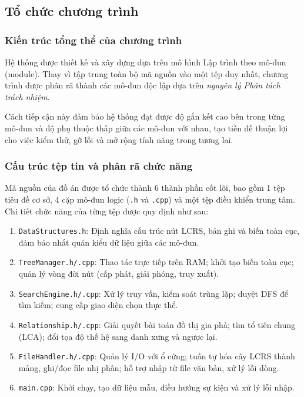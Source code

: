 \subsection{Tổ chức chương trình}
\subsubsection{Kiến trúc tổng thể của chương trình}
Hệ thống được thiết kế và xây dựng dựa trên mô hình Lập trình theo mô-đun (module). Thay vì tập trung toàn bộ mã nguồn vào một tệp duy nhất, chương trình được phân rã thành các mô-đun độc lập dựa trên \textit{nguyên lý Phân tách trách nhiệm}.

Cách tiếp cận này đảm bảo hệ thống đạt được độ gắn kết cao bên trong từng mô-đun và độ phụ thuộc thấp giữa các mô-đun với nhau, tạo tiền đề thuận lợi cho việc kiểm thử, gỡ lỗi và mở rộng tính năng trong tương lai.
\subsubsection{Cấu trúc tệp tin và phân rã chức năng}

Mã nguồn của đồ án được tổ chức thành 6 thành phần cốt lõi, bao gồm 1 tệp tiêu đề cơ sở, 4 cặp mô-đun logic (\texttt{.h} và \texttt{.cpp}) và một tệp điều khiển trung tâm. Chi tiết chức năng của từng tệp được quy định như sau:
\begin{enumerate}[label*=(\alph*)]
	\item \texttt{DataStructures.h}: Định nghĩa cấu trúc nút LCRS, bản ghi và biến toàn cục, đảm bảo nhất quán kiểu dữ liệu giữa các mô-đun.
	\item \texttt{TreeManager.h/.cpp}: Thao tác trực tiếp trên RAM; khởi tạo biến toàn cục; quản lý vòng đời nút (cấp phát, giải phóng, truy xuất).
	\item \texttt{SearchEngine.h/.cpp}: Xử lý truy vấn, kiểm soát trùng lặp; duyệt DFS để tìm kiếm; cung cấp giao diện chọn thực thể.
	\item \texttt{Relationship.h/.cpp}: Giải quyết bài toán đồ thị gia phả; tìm tổ tiên chung (LCA); đổi tọa độ thế hệ sang danh xưng và ngược lại.
	\item \texttt{FileHandler.h/.cpp}: Quản lý I/O với ổ cứng; tuần tự hóa cây LCRS thành mảng, ghi/đọc file nhị phân; hỗ trợ nhập từ file văn bản, xử lý lỗi dòng.
	\item \texttt{main.cpp}: Khởi chạy, tạo dữ liệu mẫu, điều hướng sự kiện và xử lý lỗi nhập.
\end{enumerate}

